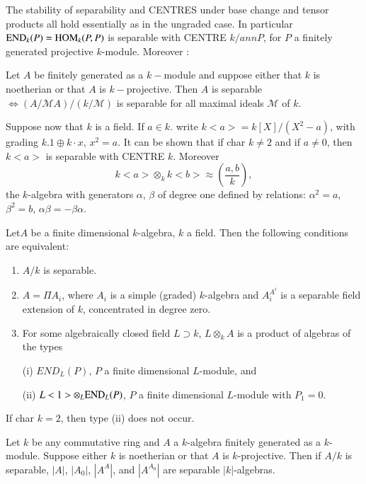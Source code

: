The stability of separability and CENTRES under base change and tensor
products all hold essentially as in the ungraded case. In particular
${\rm END}_k (P) = {\rm HOM}_k (P, P)$ is separable with CENTRE $k /
ann P$, for $P$ a finitely generated projective $k$-module. Moreover :   

\begin{prop}%
Let $A$ be finitely generated as a $k-$module and suppose either that
$k$ is noetherian or that $A$ is $k-$projective. Then $A$ is
separable $\Leftrightarrow (A / \mathscr{M} A) / (k / \mathscr{M})$
is separable for all maximal ideals $\mathscr{M}$ of $k$.  
\end{prop}

Suppose now that $k$ is a field. If $a \in k$. write $k<a> = k[X] /
(X^2- a)$, with grading $k. 1 \oplus k \cdot x$, $x^2 = a$. It can be
shown that if char $k \neq 2$ and if $a \neq 0$, then $k < a > $ is 
separable with CENTRE $k$. Moreover  
$$
k < a > \otimes_k k < b > \approx \left( \frac{ a, b}{k}\right),  
$$
the $k$-algebra with generators $\alpha$, $\beta$ of degree one
defined by relations: $\alpha^2 = a$, $\beta^2 = b$, $\alpha\beta 
 = - \beta \alpha$. 
 
\setcounter{theorem}{1}
\begin{theorem}%
Let\pageoriginale $A$ be a finite dimensional $k$-algebra, $k$ a
field. Then the following conditions are equivalent:  
\begin{enumerate}[(1)]
\item $A/k$ is separable. 

\item $A = \Pi A_i$, where $A_i$ is a simple (graded) $k$-algebra and
  $A^{A^i}_i$ is a separable field extension of $k$, concentrated in
  degree zero.  

\item For some algebraically closed field $L \supset k$, $L \otimes_k A$
  is a product of algebras of the types  

\item[(i)] $END_L(P)$, $P$ a finite dimensional $L$-module, and  

\item[(ii)] $L < 1 > \otimes _L {\rm END}_L (P)$, $P$ a finite dimensional
  $L$-module with $P_1 = 0$.  
\end{enumerate}
If char $k = 2$, then type (ii) does not occur. 
\end{theorem}

\setcounter{coro}{2}
\begin{coro}%
Let $k$ be any commutative ring and $A$ a $k$-algebra finitely
generated as a $k$-module. Suppose either $k$ is noetherian or that
$A$ is $k$-projective. Then if $A/k$ is separable, $|A|$, $|A_0|$,
$|A^A|$, and $|A^{A_0}|$ are separable $|k|$-algebras. 
\end{coro}


